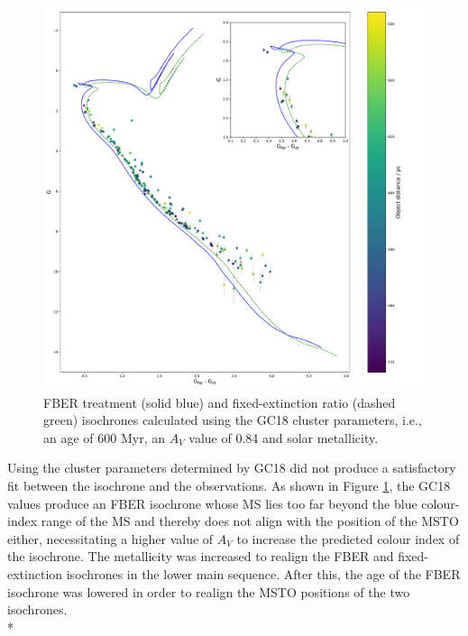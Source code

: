 \documentclass[12pt, a4paper]{report}
\begin{document}
\begin{figure}[h!]
\begin{center}
\includegraphics[width=1.0\textwidth]{../NGC_6793_CMD_FeH_0p002_Av_0p84_600Myr_isochrones_summary_errorbars.pdf}
\caption{FBER treatment (solid blue) and fixed-extinction ratio (dashed green) isochrones calculated using the GC18 cluster parameters, i.e., an age of 600 Myr, an $A_{V}$ value of 0.84 and solar metallicity.}
\label{NGC_6793_gc18_params_function}
\end{center}
\end{figure}


Using the cluster parameters determined by GC18 did not produce a satisfactory fit between the isochrone and the observations. As shown in Figure \ref{NGC_6793_gc18_params_function}, the GC18 values produce an FBER isochrone whose MS lies too far beyond the blue colour-index range of the MS and thereby does not align with the position of the MSTO either, necessitating a higher value of $A_{V}$ to increase the predicted colour index of the isochrone. The metallicity was increased to realign the FBER and fixed-extinction isochrones in the lower main sequence. After this, the age of the FBER isochrone was lowered in order to realign the MSTO positions of the two isochrones.\\*
\end{document}
